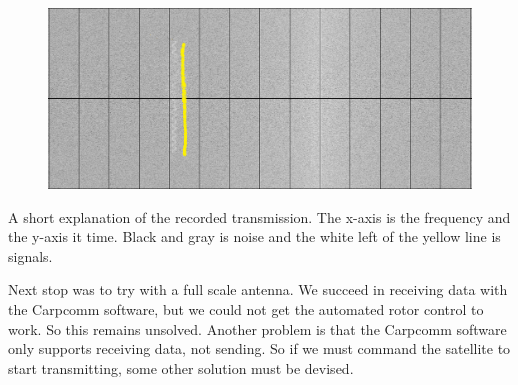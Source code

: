 \begin{figure}
	\centering
	\includegraphics[width=\textwidth]{Figures/sattelite_transmition}
	\label{fig: Transmission}
\end{figure}
A short explanation of the recorded transmission. The x-axis is the frequency and the y-axis it time. Black and gray is noise and the white left of the yellow line is signals.

Next stop was to try with a full scale antenna. We succeed in receiving data with the Carpcomm software, but we could not get the automated rotor control to work. So this remains unsolved. Another problem is that the Carpcomm software only supports receiving data, not sending. So if we must command the satellite to start transmitting, some other solution must be devised. 




